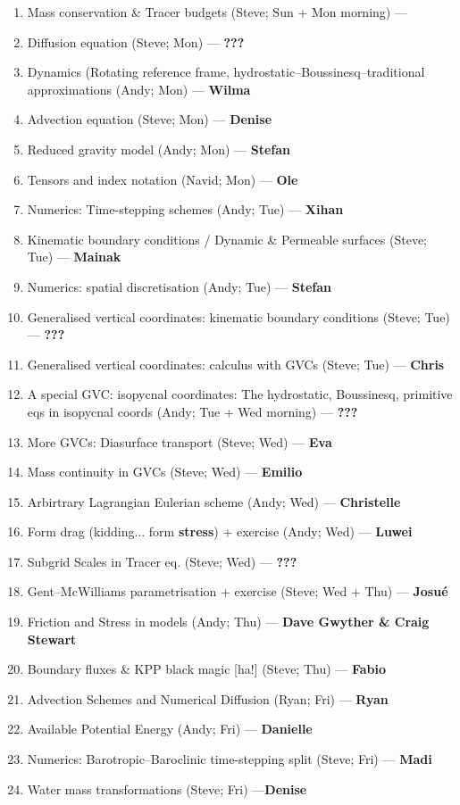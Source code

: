 \documentclass[a4paper]{article}
\numberwithin{equation}{section}
\numberwithin{figure}{section}
\begin{document}
\begin{enumerate}
    \item Mass conservation \& Tracer budgets (Steve; Sun + Mon morning) --- \textbf{}
    \item Diffusion equation (Steve; Mon) --- \textbf{???}
    \item Dynamics (Rotating reference frame, hydrostatic--Boussinesq--traditional approximations (Andy; Mon) --- \textbf{Wilma}
    \item Advection equation (Steve; Mon) --- \textbf{Denise}
    \item Reduced gravity model (Andy; Mon) --- \textbf{Stefan}
    \item Tensors and index notation (Navid; Mon) --- \textbf{Ole}
    \item Numerics: Time-stepping schemes (Andy; Tue) --- \textbf{Xihan}
    \item Kinematic boundary conditions / Dynamic \& Permeable surfaces (Steve; Tue) --- \textbf{Mainak}
    \item Numerics: spatial discretisation (Andy; Tue) --- \textbf{Stefan}
    \item Generalised vertical coordinates: kinematic boundary conditions (Steve; Tue) --- \textbf{???}
    \item Generalised vertical coordinates: calculus with GVCs (Steve; Tue) --- \textbf{Chris}
    \item A special GVC: isopycnal coordinates: The hydrostatic, Boussinesq, primitive eqs in isopycnal coords (Andy; Tue + Wed morning) --- \textbf{???}
    \item More GVCs: Diasurface transport (Steve; Wed) --- \textbf{Eva}
    \item Mass continuity in GVCs (Steve; Wed) --- \textbf{Emilio}
    \item Arbirtrary Lagrangian Eulerian scheme (Andy; Wed) --- \textbf{Christelle}
    \item Form drag (kidding... form \textbf{stress}) + exercise (Andy; Wed) --- \textbf{Luwei}
    \item Subgrid Scales in Tracer eq. (Steve; Wed) --- \textbf{???}
    \item Gent--McWilliams parametrisation + exercise (Steve; Wed + Thu) --- \textbf{Josu\'e}
    \item Friction and Stress in models (Andy; Thu) --- \textbf{Dave Gwyther \& Craig Stewart}
    \item Boundary fluxes \& KPP black magic [ha!] (Steve; Thu) --- \textbf{Fabio}
    \item Advection Schemes and Numerical Diffusion (Ryan; Fri) --- \textbf{Ryan}
    \item Available Potential Energy (Andy; Fri) --- \textbf{Danielle}
    \item Numerics: Barotropic--Baroclinic time-stepping split (Steve; Fri) --- \textbf{Madi}
    \item Water mass transformations (Steve; Fri) ---\textbf{Denise}
\end{enumerate}
\end{document}
